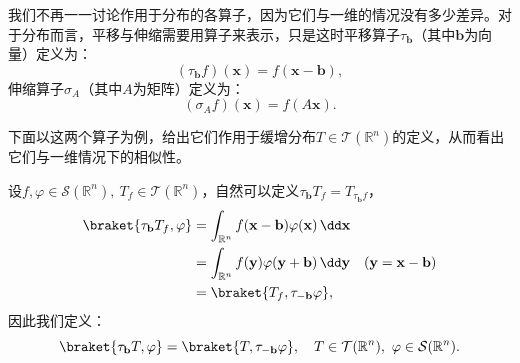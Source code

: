 我们不再一一讨论作用于分布的各算子，因为它们与一维的情况没有多少差异。对于分布而言，平移与伸缩需要用算子来表示，只是这时平移算子$\tau_{\mathbf{b}}$（其中$\mathbf{b}$为向量）定义为：
\begin{equation}
    (\tau_{\mathbf{b}}f)(\mathbf{x})=f(\mathbf{x}-\mathbf{b}),
\end{equation}
伸缩算子$\sigma_A$（其中$A$为矩阵）定义为：
\begin{equation}
    (\sigma_A f)(\mathbf{x})=f(A\mathbf{x}).
\end{equation}

下面以这两个算子为例，给出它们作用于缓增分布$T\in\mathcal{T}(\mathbb{R}^n)$的定义，从而看出它们与一维情况下的相似性。
\begin{example}[平移算子]
    设$f,\varphi\in\mathcal{S}(\mathbb{R}^n),\ T_f\in\mathcal{T}(\mathbb{R}^n)$，自然可以定义$\tau_{\mathbf{b}}T_f=T_{\tau_{\mathbf{b}}f}$，
    \begin{align}
        \braket{\tau_{\mathbf{b}}T_f,\varphi}&=\int_{\mathbb{R}^n}f(\mathbf{x}-\mathbf{b})\varphi(\mathbf{x})\,\dd\mathbf{x}\nonumber\\
        &=\int_{\mathbb{R}^n}f(\mathbf{y})\varphi(\mathbf{y}+\mathbf{b})\,\dd\mathbf{y}\quad(\mathbf{y}=\mathbf{x}-\mathbf{b})\nonumber\\
        &=\braket{T_f,\tau_{-\mathbf{b}}\varphi},
    \end{align}
    因此我们定义：
    \begin{equation}
        \braket{\tau_{\mathbf{b}}T,\varphi}=\braket{T,\tau_{-\mathbf{b}}\varphi},\quad T\in\mathcal{T}(\mathbb{R}^n),\ \varphi\in\mathcal{S}(\mathbb{R}^n).
    \end{equation}
\end{example}

